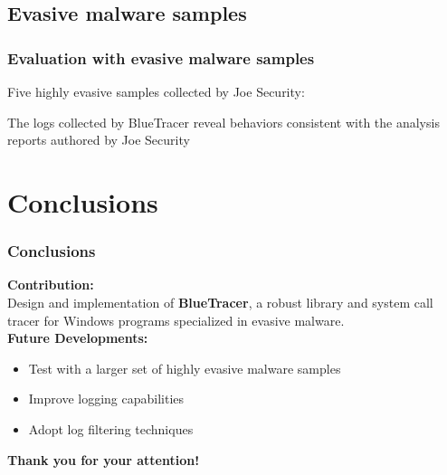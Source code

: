 \documentclass[compress]{beamer}
\begin{document}
\subsection{Evasive malware samples}
\begin{frame}
    \frametitle{Evaluation with evasive malware samples}
    
	Five highly evasive samples collected by Joe Security:    
    
    \begin{table}[h]
\vspace*{0.1cm}
\begin{center}
\end{center}
\end{table}
\medskip
\begin{beamerboxesrounded}[shadow=true]{}
The
logs collected by BlueTracer reveal behaviors consistent with the analysis reports
authored by Joe Security
\end{beamerboxesrounded}	

\end{frame}

\section{Conclusions}

\begin{frame}
    \frametitle{Conclusions}
	
	\textbf{\textcolor{sapienza}{Contribution:}} \\
	\smallskip	
	\tab Design and implementation of \textbf{BlueTracer},
a robust library and system call tracer for Windows programs specialized in evasive
malware.
	\\\bigskip
	\textbf{\textcolor{sapienza}{Future Developments:}} \\
	\begin{itemize}
	\item Test with a larger set of highly evasive malware samples
	\item Improve logging capabilities
	\item Adopt log filtering techniques
	\end{itemize}

\end{frame}

\begin{frame}
\begin{center}
{\fontsize{15}{15}\selectfont \textbf{Thank you for your attention!}}
\end{center}
\end{frame}
\end{document}
